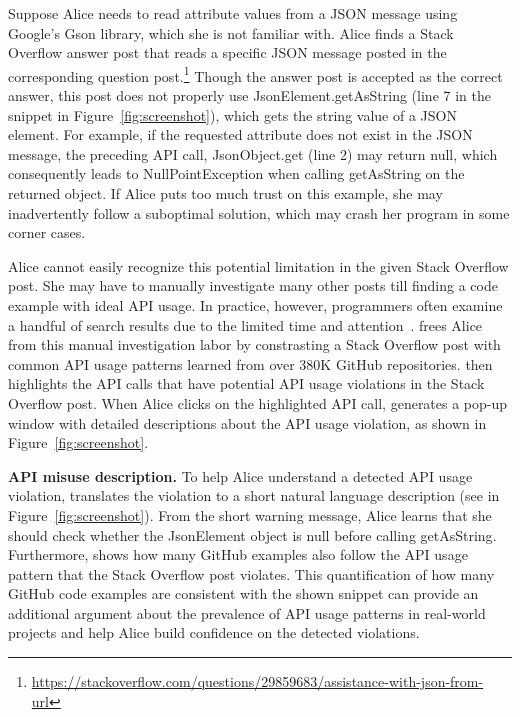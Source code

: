 
Suppose Alice needs to read attribute values from a {\ttt JSON} message using Google's Gson library, which she is not familiar with. Alice finds a Stack Overflow answer post that reads a specific {\ttt JSON} message posted in the corresponding question post.\footnote{\url{https://stackoverflow.com/questions/29859683/assistance-with-json-from-url}} Though the answer post is accepted as the correct answer, this post does not properly use {\ttt JsonElement.getAsString} (line 7 in the snippet in Figure~\ref{fig:screenshot}), which gets the {\ttt string} value of a {\ttt JSON} element. For example, if the requested attribute does not exist in the {\ttt JSON} message, the preceding API call, {\ttt JsonObject.get} (line 2) may return {\ttt null}, which consequently leads to {\ttt NullPointException} when calling {\ttt getAsString} on the returned object. If Alice puts too much trust on this example, she may inadvertently follow a suboptimal solution, which may crash her program in some corner cases. 

Alice cannot easily recognize this potential limitation in the given Stack Overflow post. She may have to manually investigate many other posts till finding a code example with ideal API usage. In practice, however, programmers often examine a handful of search results due to the limited time and attention~\cite{brandt2009two, starke2009working, duala2012asking}. {\tool} frees Alice from this manual investigation labor by constrasting a Stack Overflow post with common API usage patterns learned from over 380K GitHub repositories. {\tool} then highlights the API calls that have potential API usage violations in the Stack Overflow post. When Alice clicks on the highlighted API call, {\tool} generates a pop-up window with detailed descriptions about the API usage violation, as shown in Figure~\ref{fig:screenshot}.

{\bf API misuse description.} To help Alice understand a detected API usage violation, {\tool} translates the violation to a short natural language description (see  in Figure~\ref{fig:screenshot}). From  the short warning message, Alice learns that she should check whether the {\ttt JsonElement} object is {\ttt null} before calling {\ttt getAsString}. Furthermore, {\tool} shows how many GitHub examples also follow the API usage pattern that the Stack Overflow post violates. This quantification of how many GitHub code examples are consistent with the shown snippet can provide an additional argument about the prevalence of API usage patterns in real-world projects and help Alice build confidence on the detected violations.

